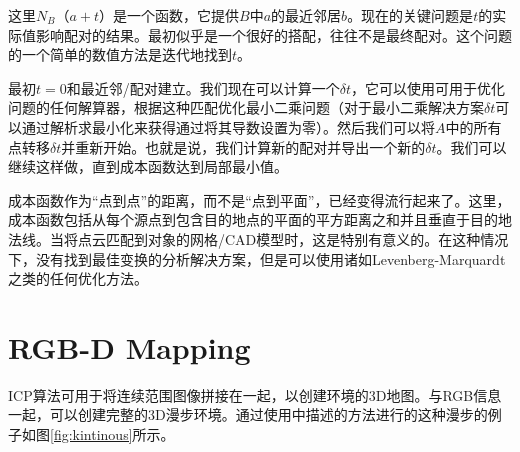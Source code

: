 
这里$N_B（a+t）$是一个函数，它提供$B$中$a$的最近邻居$b$。现在的关键问题是$t$的实际值影响配对的结果。最初似乎是一个很好的搭配，往往不是最终配对。这个问题的一个简单的数值方法是迭代地找到$t$。

最初$t=0$和最近邻/配对建立。我们现在可以计算一个$\delta t$，它可以使用可用于优化问题的任何解算器，根据这种匹配优化最小二乘问题（对于最小二乘解决方案$\delta t$可以通过解析求最小化来获得通过将其导数设置为零）。然后我们可以将$A$中的所有点转移$\delta t$并重新开始。也就是说，我们计算新的配对并导出一个新的$\delta t$。我们可以继续这样做，直到成本函数达到局部最小值。

成本函数作为“点到点”的距离，而不是“点到平面”，已经变得流行起来了。这里，成本函数包括从每个源点到包含目的地点的平面的平方距离之和并且垂直于目的地法线。当将点云匹配到对象的网格/CAD模型时，这是特别有意义的。在这种情况下，没有找到最佳变换的分析解决方案，但是可以使用诸如Levenberg-Marquardt之类的任何优化方法。



\section{RGB-D Mapping}
ICP算法可用于将连续范围图像拼接在一起，以创建环境的3D地图\cite{henry2010rgb}。与RGB信息一起，可以创建完整的3D漫步环境。通过使用\cite{whelan2013robust}中描述的方法进行的这种漫步的例子如图\ref{fig:kintinous}所示。

